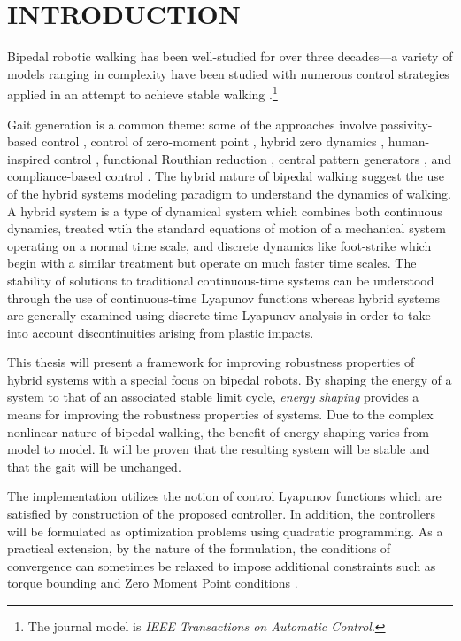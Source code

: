 \chapter*{\uppercase{Introduction}}

Bipedal robotic walking has been well-studied for over three decades---a variety of models ranging in complexity have been studied with numerous control strategies applied in an attempt to achieve stable walking \cite{aut_2014_gcsa_01,Hurmuzlu20041647,WGCCM07}.\let\thefootnote\relax\footnote{The journal model is {\em IEEE Transactions on Automatic Control}.}


%
Gait generation is a common theme: some of the approaches involve passivity-based control \cite{CRTW05,aut_2014_gcsa_01,cdc_2009_sa_01,SB05}, control of zero-moment point \cite{FAA10,KKKFHYH06,VB04}, hybrid zero dynamics \cite{CDG08,WGCCM07,WGK03}, human-inspired control \cite{ijbbr_2014_sja_01,ifac_2011_spsa_01}, functional Routhian reduction \cite{AGS06,nolcos_2010_gcas_01,cdc_2009_sa_02}, central pattern generators \cite{RH02,TAT03}, and compliance-based control \cite{PDP97}.
%
The hybrid nature of bipedal walking suggest the use of the hybrid systems modeling paradigm to understand the dynamics of walking.
%
A hybrid system is a type of dynamical system which combines both continuous dynamics, treated wtih the standard equations of motion of a mechanical system operating on a normal time scale, and discrete dynamics like foot-strike which begin with a similar treatment but operate on much faster time scales.
%
The stability of solutions to traditional continuous-time systems can be understood through the use of continuous-time Lyapunov functions whereas hybrid systems are generally examined using discrete-time Lyapunov analysis in order to take into account discontinuities arising from plastic impacts.

This thesis will present a framework for improving robustness properties of hybrid systems with a special focus on bipedal robots.
%
By shaping the energy of a system to that of an associated stable limit cycle, {\em energy shaping} provides a means for improving the robustness properties of systems.
%
Due to the complex nonlinear nature of bipedal walking, the benefit of energy shaping varies from model to model.
%
It will be proven that the resulting system will be stable and that the gait will be unchanged.

The implementation utilizes the notion of control Lyapunov functions which are satisfied by construction of the proposed controller.
%
In addition, the controllers will be formulated as optimization problems using quadratic programming.
%
As a practical extension, by the nature of the formulation, the conditions of convergence can sometimes be relaxed to impose additional constraints such as torque bounding and Zero Moment Point conditions \cite{VB04}.

